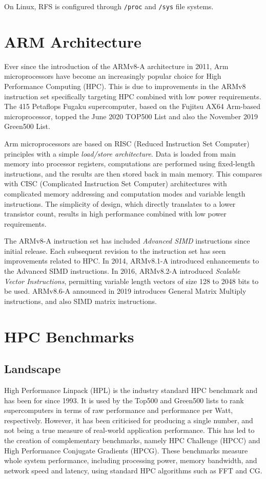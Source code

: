 On Linux, RFS is configured through \verb|/proc| and \verb|/sys| file systems.


%
%
\section{ARM Architecture}

Ever since the introduction of the ARMv8-A architecture in 2011, Arm microprocessors have become an increasingly popular choice for High Performance Computing (HPC). This is due to improvements in the ARMv8 instruction set specifically targeting HPC combined with low power requirements. The 415 Petaflops Fugaku supercomputer, based on the Fujitsu AX64 Arm-based microprocessor, topped the June 2020 TOP500 List and also the November 2019 Green500 List.

Arm microprocessors are based on RISC (Reduced Instruction Set Computer) principles with a simple \emph{load/store architecture}. Data is loaded from main memory into processor registers, computations are performed using fixed-length instructions, and the results are then stored back in main memory. This compares with CISC (Complicated Instruction Set Computer) architectures with complicated memory addressing and computation modes and variable length instructions. The simplicity of design, which directly translates to a lower transistor count, results in high performance combined with low power requirements.

The ARMv8-A instruction set has included \emph{Advanced SIMD} instructions since initial release. Each subsequent revision to the instruction set has seen improvements related to HPC. In 2014, ARMv8.1-A introduced enhancements to the Advanced SIMD instructions. In 2016, ARMv8.2-A introduced \emph{Scalable Vector Instructions}, permitting variable length vectors of size 128 to 2048 bits to be used. ARMv8.6-A announced in 2019 introduces General Matrix Multiply instructions, and also SIMD matrix instructions.



%
%
\section{HPC Benchmarks}

\subsection{Landscape}

High Performance Linpack (HPL) is the industry standard HPC benchmark and has been for since 1993. It is used by the Top500 and Green500 lists to rank supercomputers in terms of raw performance and performance per Watt, respectively. However, it has been criticised for producing a single number, and not being a true measure of real-world application performance. This has led to the creation of complementary benchmarks, namely HPC Challenge (HPCC) and High Performance Conjugate Gradients (HPCG). These benchmarks measure whole system performance, including processing power, memory bandwidth, and network speed and latency, using standard HPC algorithms such as FFT and CG.


